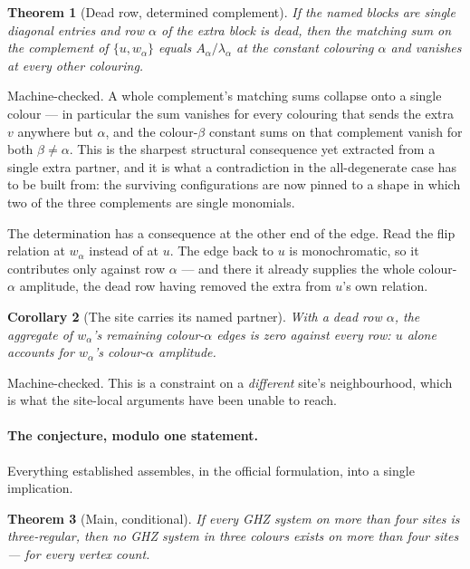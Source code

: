 \documentclass[11pt]{article}
\newtheorem{theorem}{Theorem}[section]
\newtheorem{corollary}[theorem]{Corollary}
\theoremstyle{definition}
\theoremstyle{remark}
\begin{document}
\begin{theorem}[Dead row, determined complement]\label{thm:deadrow}
If the named blocks are single diagonal entries and row $\alpha$ of the extra block is dead,
then the matching sum on the complement of $\{u, w_\alpha\}$ equals $A_\alpha/\lambda_\alpha$
at the constant colouring $\alpha$ and vanishes at every other colouring.
\end{theorem}

Machine-checked. A whole complement's matching sums collapse onto a single colour --- in
particular the sum vanishes for every colouring that sends the extra $v$ anywhere but
$\alpha$, and the colour-$\beta$ constant sums on that complement vanish for both
$\beta \neq \alpha$. This is the sharpest structural consequence yet extracted from a single
extra partner, and it is what a contradiction in the all-degenerate case has to be built
from: the surviving configurations are now pinned to a shape in which two of the three
complements are single monomials.

The determination has a consequence at the other end of the edge. Read the flip relation at
$w_\alpha$ instead of at $u$. The edge back to $u$ is monochromatic, so it contributes only
against row $\alpha$ --- and there it already supplies the whole colour-$\alpha$ amplitude,
the dead row having removed the extra from $u$'s own relation.

\begin{corollary}[The site carries its named partner]\label{cor:carried}
With a dead row $\alpha$, the aggregate of $w_\alpha$'s remaining colour-$\alpha$ edges is
zero against every row: $u$ alone accounts for $w_\alpha$'s colour-$\alpha$ amplitude.
\end{corollary}

Machine-checked. This is a constraint on a \emph{different} site's neighbourhood, which is
what the site-local arguments have been unable to reach.

\paragraph{The conjecture, modulo one statement.} Everything established assembles, in the
official formulation, into a single implication.

\begin{theorem}[Main, conditional]\label{thm:main}
If every GHZ system on more than four sites is three-regular, then no GHZ system in three
colours exists on more than four sites --- for every vertex count.
\end{theorem}
\end{document}
